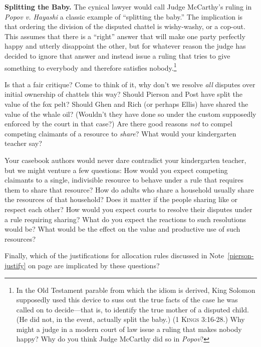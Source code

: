 
\item \textbf{Splitting the Baby.} The cynical lawyer would call Judge
McCarthy's ruling in \textit{Popov v. Hayashi} a classic example of ``splitting
the baby.'' The implication is that ordering the division of the disputed
chattel is wishy-washy, or a cop-out. This assumes that there is a ``right''
answer that will make one party perfectly happy and utterly disappoint the
other, but for whatever reason the judge has decided to ignore that answer and
instead issue a ruling that tries to give something to everybody and therefore
satisfies nobody.\footnote{In the Old Testament parable from which the idiom is
derived, King Solomon supposedly used this device to suss out the true facts of
the case he was called on to decide---that is, to identify the true mother of a
disputed child. (He did not, in the event, actually split the baby.) (1
\textsc{Kings} 3:16-28.) Why might a judge in a modern court of law issue a
ruling that makes nobody happy? Why do you think Judge McCarthy did so in
\textit{Popov}?}


Is that a fair critique? Come to think of it, why don't we resolve \textit{all}
disputes over initial ownership of chattels this way? Should Pierson and Post
have split the value of the fox pelt? Should Ghen and Rich (or perhaps Ellis)
have shared the value of the whale oil? (Wouldn't they have done so under the
custom supposedly enforced by the court in that case?) Are there good reasons
\textit{not} to compel competing claimants of a resource to \textit{share}? What
would your kindergarten teacher say?

Your casebook authors would never dare contradict your kindergarten teacher, but
we might venture a few questions: How would you expect competing claimants to a
single, indivisible resource to behave under a rule that requires them to share
that resource? How do adults who share a household usually share the resources
of that household? Does it matter if the people sharing like or respect each
other? How would you expect courts to resolve their disputes under a rule
requiring sharing? What do you expect the reactions to such resolutions would
be? What would be the effect on the value and productive use of such resources? 

Finally, which of the justifications for allocation rules discussed in
Note~\ref{pierson-justify} on page \pageref{pierson-justify}
are implicated by these questions?



